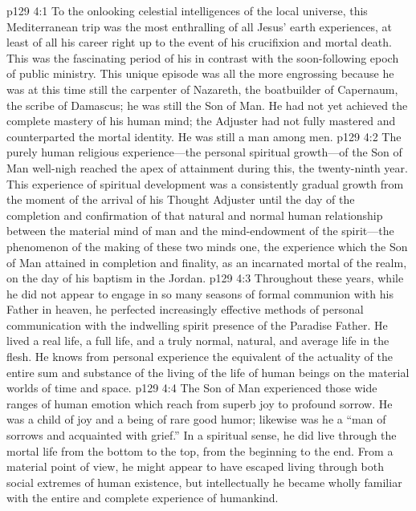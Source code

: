 \vs p129 4:1 To the onlooking celestial intelligences of the local universe, this Mediterranean trip was the most enthralling of all Jesus’ earth experiences, at least of all his career right up to the event of his crucifixion and mortal death. This was the fascinating period of his  in contrast with the soon\hyp{}following epoch of public ministry. This unique episode was all the more engrossing because he was at this time still the carpenter of Nazareth, the boatbuilder of Capernaum, the scribe of Damascus; he was still the Son of Man. He had not yet achieved the complete mastery of his human mind; the Adjuster had not fully mastered and counterparted the mortal identity. He was still a man among men.
\vs p129 4:2 The purely human religious experience---the personal spiritual growth---of the Son of Man well\hyp{}nigh reached the apex of attainment during this, the twenty\hyp{}ninth year. This experience of spiritual development was a consistently gradual growth from the moment of the arrival of his Thought Adjuster until the day of the completion and confirmation of that natural and normal human relationship between the material mind of man and the mind\hyp{}endowment of the spirit---the phenomenon of the making of these two minds one, the experience which the Son of Man attained in completion and finality, as an incarnated mortal of the realm, on the day of his baptism in the Jordan.
\vs p129 4:3 Throughout these years, while he did not appear to engage in so many seasons of formal communion with his Father in heaven, he perfected increasingly effective methods of personal communication with the indwelling spirit presence of the Paradise Father. He lived a real life, a full life, and a truly normal, natural, and average life in the flesh. He knows from personal experience the equivalent of the actuality of the entire sum and substance of the living of the life of human beings on the material worlds of time and space.
\vs p129 4:4 The Son of Man experienced those wide ranges of human emotion which reach from superb joy to profound sorrow. He was a child of joy and a being of rare good humor; likewise was he a “man of sorrows and acquainted with grief.” In a spiritual sense, he did live through the mortal life from the bottom to the top, from the beginning to the end. From a material point of view, he might appear to have escaped living through both social extremes of human existence, but intellectually he became wholly familiar with the entire and complete experience of humankind.
